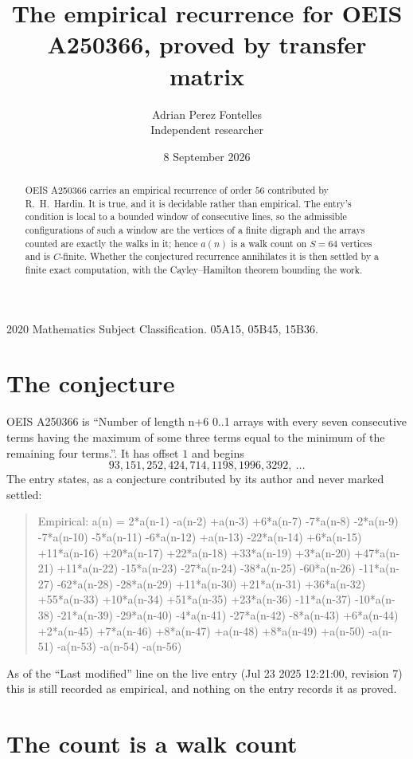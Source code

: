 \documentclass[11pt,a4paper]{article}
\title{The empirical recurrence for OEIS A250366, proved by transfer matrix}
\author{Adrian Perez Fontelles\\ \small Independent researcher}
\date{8 September 2026}
\theoremstyle{plain}
\theoremstyle{definition}
\begin{document}
\maketitle

\begin{abstract}
OEIS A250366 carries an empirical recurrence of order $56$ contributed by R.~H.~Hardin. It is
true, and it is decidable rather than empirical. The entry's condition is local to a bounded window of consecutive lines, so
the admissible configurations of such a window are the vertices of a finite digraph and the
arrays counted are exactly the walks in it; hence $a(n)$ is a walk count on $S=64$ vertices
and is $C$-finite. Whether the conjectured recurrence annihilates it is then settled by a
finite exact computation, with the Cayley--Hamilton theorem bounding the work.
\end{abstract}

\noindent\small 2020 Mathematics Subject Classification. 05A15, 05B45, 15B36.\normalsize

\section{The conjecture}

OEIS A250366 is ``Number of length n+6 0..1 arrays with every seven consecutive terms having the maximum of some three terms equal to the minimum of the remaining four terms.''. It has offset $1$ and begins
\[
93, 151, 252, 424, 714, 1198, 1996, 3292,\ \dots
\]
The entry states, as a conjecture contributed by its author and never marked settled:
\begin{quote}
Empirical: a(n) = 2*a(n-1) -a(n-2) +a(n-3) +6*a(n-7) -7*a(n-8) -2*a(n-9) -7*a(n-10) -5*a(n-11) -6*a(n-12) +a(n-13) -22*a(n-14) +6*a(n-15) +11*a(n-16) +20*a(n-17) +22*a(n-18) +33*a(n-19) +3*a(n-20) +47*a(n-21) +11*a(n-22) -15*a(n-23) -27*a(n-24) -38*a(n-25) -60*a(n-26) -11*a(n-27) -62*a(n-28) -28*a(n-29) +11*a(n-30) +21*a(n-31) +36*a(n-32) +55*a(n-33) +10*a(n-34) +51*a(n-35) +23*a(n-36) -11*a(n-37) -10*a(n-38) -21*a(n-39) -29*a(n-40) -4*a(n-41) -27*a(n-42) -8*a(n-43) +6*a(n-44) +2*a(n-45) +7*a(n-46) +8*a(n-47) +a(n-48) +8*a(n-49) +a(n-50) -a(n-51) -a(n-53) -a(n-54) -a(n-56)
\end{quote}
As of the ``Last modified'' line on the live entry (Jul 23 2025 12:21:00, revision 7) this is still
recorded as empirical, and nothing on the entry records it as proved.

\section{The count is a walk count}
\end{document}
